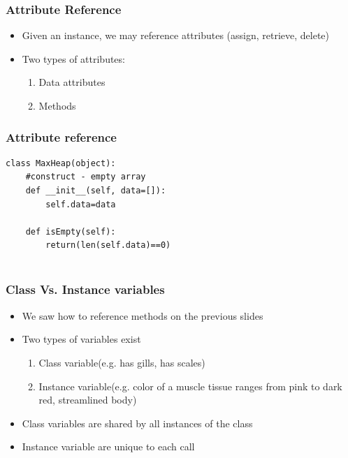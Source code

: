 \documentclass{beamer}
\begin{document}
\begin{frame}
\frametitle{Attribute Reference}

\begin{itemize}
\item Given an instance, we may reference attributes (assign, retrieve, delete)
\item Two types of attributes:
\begin{enumerate}
\item Data attributes
\item Methods
\end{enumerate}

\end{itemize}


\end{frame}



\begin{frame}[fragile]
\frametitle{Attribute reference}



\begin{Verbatim}
class MaxHeap(object):
	#construct - empty array
	def __init__(self, data=[]):
		self.data=data
	
	def isEmpty(self):
		return(len(self.data)==0)
		
\end{Verbatim}


\end{frame}



\begin{frame}
\frametitle{Class Vs. Instance variables}

\begin{itemize}
\item We saw how to reference methods on the previous slides
\item Two types of variables exist
\begin{enumerate}
\item Class variable(e.g. has gills, has scales)
\item Instance variable(e.g. color of a muscle tissue ranges from pink to dark red, streamlined body)
\end{enumerate}
\item Class variables are shared by all instances of the class
\item Instance variable are unique to each call
\end{itemize}


\end{frame}
\end{document}
